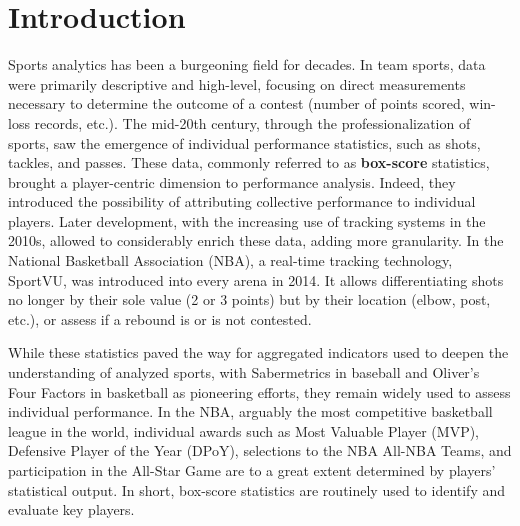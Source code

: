 \section{Introduction}
\label{sec:intro}

Sports analytics has been a burgeoning field for decades.
In team sports, data were primarily descriptive and high-level, focusing on direct measurements necessary to determine the outcome of a contest (number of points scored, win-loss records, etc.).
The mid-20th century, through the professionalization of sports, saw the emergence of individual performance statistics, such as shots, tackles, and passes.
These data, commonly referred to as \textbf{box-score} statistics, brought a player-centric dimension to performance analysis.
Indeed, they introduced the possibility of attributing collective performance to individual players. 
Later development, with the increasing use of tracking systems in the 2010s, allowed to considerably enrich these data, adding more granularity.
In the National Basketball Association (NBA), a real-time tracking technology, SportVU, was introduced into every arena in 2014.
It allows differentiating shots no longer by their sole value (2 or 3 points) but by their location (elbow, post, etc.), or assess if a rebound is or is not contested. \newline

While these statistics paved the way for aggregated indicators used to deepen the understanding of analyzed sports, with Sabermetrics in baseball \citep{James1984TheBJ} and Oliver's Four Factors in basketball \citep{oliver2004basketball} as pioneering efforts, they remain widely used to assess individual performance.
In the NBA, arguably the most competitive basketball league in the world, individual awards such as Most Valuable Player (MVP), Defensive Player of the Year (DPoY), selections to the NBA All-NBA Teams, and participation in the All-Star Game are to a great extent determined by players' statistical output.
In short, box-score statistics are routinely used to identify and evaluate key players.

